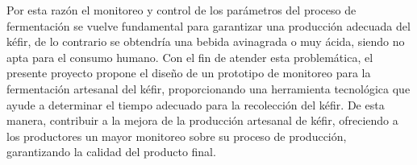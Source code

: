 Por esta razón el monitoreo y control de los parámetros del proceso de fermentación
se vuelve fundamental para garantizar una producción adecuada del kéfir, de lo
contrario se obtendría una bebida avinagrada o muy ácida, siendo no apta para el
consumo humano. Con el fin de atender esta problemática, el presente proyecto
propone el diseño de un prototipo de monitoreo para la fermentación artesanal del
kéfir, proporcionando una herramienta tecnológica que ayude a determinar el tiempo
adecuado para la recolección del kéfir. De esta manera, contribuir a la mejora de la
producción artesanal de kéfir, ofreciendo a los productores un mayor monitoreo
sobre su proceso de producción, garantizando la calidad del producto final.